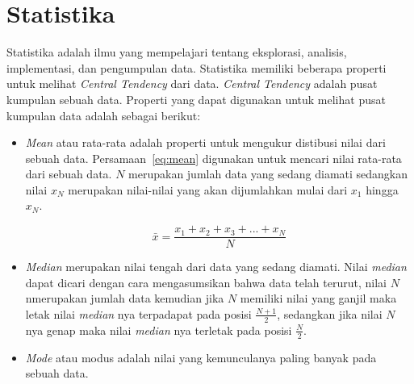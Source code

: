 \section{Statistika~\cite{han:22:datmin}}
\label{sec:stat}

Statistika adalah ilmu yang mempelajari tentang eksplorasi, analisis, implementasi, dan pengumpulan data. Statistika memiliki beberapa properti untuk melihat \textit{Central Tendency} dari data. \textit{Central Tendency} adalah pusat kumpulan sebuah data. Properti yang dapat digunakan untuk melihat pusat kumpulan data adalah sebagai berikut:
\begin{itemize}
    \item \textit{Mean} atau rata-rata adalah properti untuk mengukur distibusi nilai dari sebuah data. Persamaan~\ref{eq:mean} digunakan untuk mencari nilai rata-rata dari sebuah data. $N$ merupakan jumlah data yang sedang diamati sedangkan nilai $x_N$ merupakan nilai-nilai yang akan dijumlahkan mulai dari $x_1$ hingga $x_N$.

    \begin{equation}
    \label{eq:mean}
        \bar{x} = \frac{x_1+x_2+x_3+...+x_N}{N}
    \end{equation}

     \item \textit{Median} merupakan nilai tengah dari data yang sedang diamati. Nilai \textit{median} dapat dicari dengan cara mengasumsikan bahwa data telah terurut, nilai $N$ nmerupakan jumlah data kemudian jika $N$ memiliki nilai yang ganjil maka letak nilai \textit{median} nya terpadapat pada posisi $\frac{N+1}{2}$, sedangkan jika nilai $N$ nya genap maka nilai \textit{median} nya terletak pada posisi $\frac{N}{2}$.

     \item \textit{Mode} atau modus adalah nilai yang kemunculanya paling banyak pada sebuah data.
\end{itemize}


